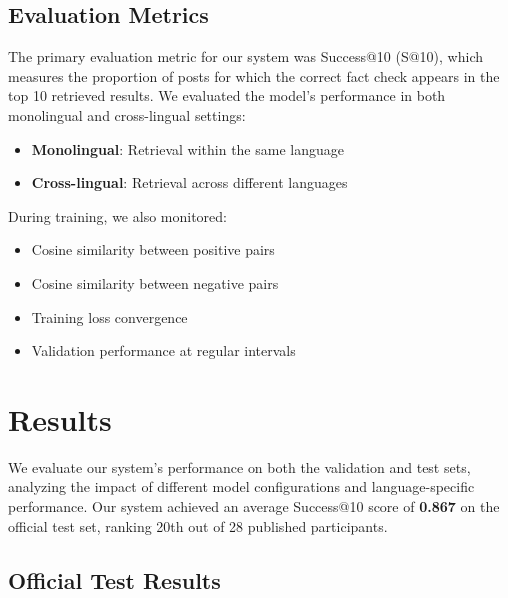 \documentclass[11pt]{article}
\begin{document}
\subsection{Evaluation Metrics}

The primary evaluation metric for our system was Success@10 (S@10), which measures the proportion of posts for which the correct fact check appears in the top 10 retrieved results. We evaluated the model's performance in both monolingual and cross-lingual settings:

\begin{itemize}
    \item \textbf{Monolingual}: Retrieval within the same language
    \item \textbf{Cross-lingual}: Retrieval across different languages
\end{itemize}

During training, we also monitored:
\begin{itemize}
    \item Cosine similarity between positive pairs
    \item Cosine similarity between negative pairs
    \item Training loss convergence
    \item Validation performance at regular intervals
\end{itemize}

\section{Results}

We evaluate our system's performance on both the validation and test sets, analyzing the impact of different model configurations and language-specific performance. Our system achieved an average Success@10 score of \textbf{0.867} on the official test set, ranking 20th out of 28 published participants.

\subsection{Official Test Results}
\end{document}
